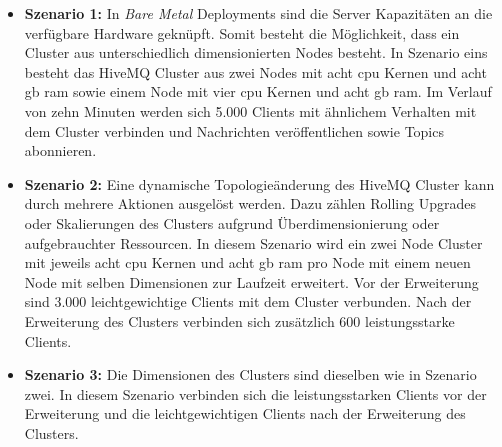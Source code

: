 \begin{itemize}
  \item \textbf{Szenario 1:} In \textit{Bare Metal} Deployments sind die Server Kapazitäten an die verfügbare Hardware geknüpft. Somit besteht die Möglichkeit, dass ein Cluster aus unterschiedlich dimensionierten Nodes besteht. In Szenario eins besteht das HiveMQ Cluster aus zwei Nodes mit acht \ac{cpu} Kernen und acht \ac{gb} \ac{ram} sowie einem Node mit vier \ac{cpu} Kernen und acht \ac{gb} \ac{ram}. Im Verlauf von zehn Minuten werden sich 5.000 Clients mit ähnlichem Verhalten mit dem Cluster verbinden und Nachrichten veröffentlichen sowie Topics abonnieren.
  \item \textbf{Szenario 2:} Eine dynamische Topologieänderung des HiveMQ Cluster kann durch mehrere Aktionen ausgelöst werden. Dazu zählen Rolling Upgrades oder Skalierungen des Clusters aufgrund Überdimensionierung oder aufgebrauchter Ressourcen. In diesem Szenario wird ein zwei Node Cluster mit jeweils acht \ac{cpu} Kernen und acht \ac{gb} \ac{ram} pro Node mit einem neuen Node mit selben Dimensionen zur Laufzeit erweitert. Vor der Erweiterung sind 3.000 leichtgewichtige Clients mit dem Cluster verbunden. Nach der Erweiterung des Clusters verbinden sich zusätzlich 600 leistungsstarke Clients.
  \item \textbf{Szenario 3:} Die Dimensionen des Clusters sind dieselben wie in Szenario zwei. In diesem Szenario verbinden sich die leistungsstarken Clients vor der Erweiterung und die leichtgewichtigen Clients nach der Erweiterung des Clusters.
\end{itemize}

